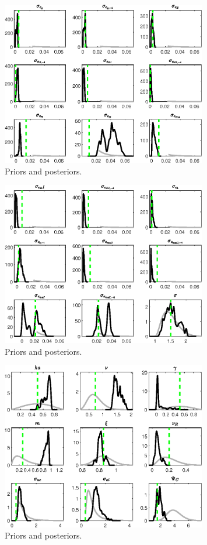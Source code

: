  
\begin{figure}[H]
\centering
\includegraphics[width=0.80\textwidth]{BRS_sectoral_rest/Output/BRS_sectoral_rest_PriorsAndPosteriors1}
\caption{Priors and posteriors.}\label{Fig:PriorsAndPosteriors:1}
\end{figure}
 
\begin{figure}[H]
\centering
\includegraphics[width=0.80\textwidth]{BRS_sectoral_rest/Output/BRS_sectoral_rest_PriorsAndPosteriors2}
\caption{Priors and posteriors.}\label{Fig:PriorsAndPosteriors:2}
\end{figure}
 
\begin{figure}[H]
\centering
\includegraphics[width=0.80\textwidth]{BRS_sectoral_rest/Output/BRS_sectoral_rest_PriorsAndPosteriors3}
\caption{Priors and posteriors.}\label{Fig:PriorsAndPosteriors:3}
\end{figure}
 
